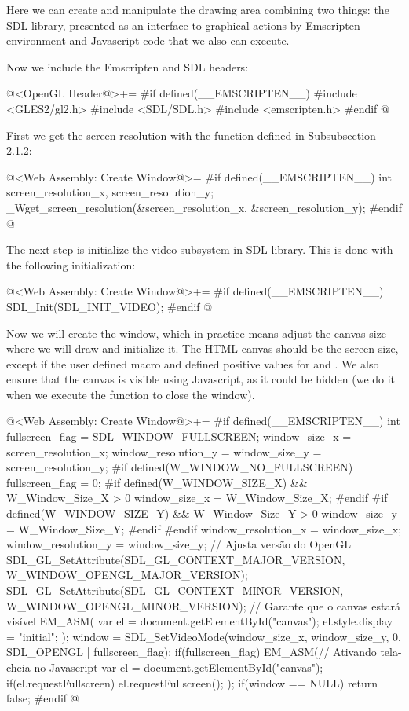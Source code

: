 Here we can create and manipulate the drawing area combining two
things: the SDL library, presented as an interface to graphical
actions by Emscripten environment and Javascript code that we also can
execute.

Now we include the Emscripten and SDL headers:

\iniciocodigo
@<OpenGL Header@>+=
#if defined(__EMSCRIPTEN__)
#include <GLES2/gl2.h>
#include <SDL/SDL.h>
#include <emscripten.h>
#endif
@
\fimcodigo

First we get the screen resolution with the function defined in
Subsubsection 2.1.2:

\iniciocodigo
@<Web Assembly: Create Window@>=
#if defined(__EMSCRIPTEN__)
int screen_resolution_x, screen_resolution_y;
_Wget_screen_resolution(&screen_resolution_x, &screen_resolution_y);
#endif
@
\fimcodigo

The next step is initialize the video subsystem in SDL library. This
is done with the following initialization:

\iniciocodigo
@<Web Assembly: Create Window@>+=
#if defined(__EMSCRIPTEN__)
SDL_Init(SDL_INIT_VIDEO);
#endif
@
\fimcodigo

Now we will create the window, which in practice means adjust the
canvas size where we will draw and initialize it. The HTML canvas
should be the screen size, except if the user defined
macro  and defined positive
values for 
and . We also ensure that the
canvas is visible using Javascript, as it could be hidden (we do it
when we execute the function to close the window).

\iniciocodigo
@<Web Assembly: Create Window@>+=
#if defined(__EMSCRIPTEN__)
{
  int fullscreen_flag = SDL_WINDOW_FULLSCREEN;
  window_size_x = screen_resolution_x;
  window_resolution_y = window_size_y = screen_resolution_y;
#if defined(W_WINDOW_NO_FULLSCREEN)
  fullscreen_flag = 0;
#if defined(W_WINDOW_SIZE_X) && W_Window_Size_X > 0
  window_size_x = W_Window_Size_X;
#endif
#if defined(W_WINDOW_SIZE_Y) && W_Window_Size_Y > 0
  window_size_y = W_Window_Size_Y;
#endif
#endif
  window_resolution_x = window_size_x;
  window_resolution_y = window_size_y;
  // Ajusta versão do OpenGL
  SDL_GL_SetAttribute(SDL_GL_CONTEXT_MAJOR_VERSION,
                     W_WINDOW_OPENGL_MAJOR_VERSION);
  SDL_GL_SetAttribute(SDL_GL_CONTEXT_MINOR_VERSION,
                     W_WINDOW_OPENGL_MINOR_VERSION);
  // Garante que o canvas estará visível
  EM_ASM(
    var el = document.getElementById("canvas");
    el.style.display = "initial";
  );
  window = SDL_SetVideoMode(window_size_x, window_size_y, 0,
                            SDL_OPENGL | fullscreen_flag);
  if(fullscreen_flag){
    EM_ASM(// Ativando tela-cheia no Javascript
      var el = document.getElementById("canvas");
      if(el.requestFullscreen){
        el.requestFullscreen();
      }
    );
  }
  if(window == NULL)
    return false;
}
#endif
@
\fimcodigo

